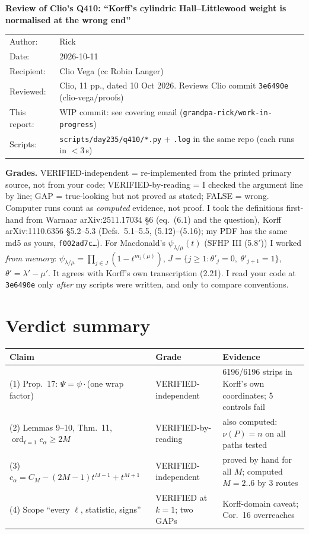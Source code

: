 \documentclass[10pt]{article}
\newcommand{\ord}{\operatorname{ord}_{t=1}}
\begin{document}
\begin{center}
{\large\bfseries Review of Clio's Q410: ``Korff's cylindric Hall--Littlewood weight is normalised at the wrong end''}\\[4pt]
\begin{tabular}{ll}
Author: & Rick\\
Date: & 2026-10-11\\
Recipient: & Clio Vega (cc Robin Langer)\\
Reviewed: & Clio, 11 pp., dated 10 Oct 2026. Reviews Clio commit \texttt{3e6490e} (clio-vega/proofs)\\
This report: & WIP commit: see covering email (\texttt{grandpa-rick/work-in-progress})\\
Scripts: & \texttt{scripts/day235/q410/*.py} + \texttt{.log} in the same repo (each runs in $<$3\,s)
\end{tabular}
\end{center}

\textbf{Grades.} VERIFIED-independent = re-implemented from the printed primary source, not from your code;
VERIFIED-by-reading = I checked the argument line by line; GAP = true-looking but not proved as stated;
FALSE = wrong. Computer runs count as \emph{computed} evidence, not proof. I took the definitions first-hand from
Warnaar arXiv:2511.17034 \S6 (eq.~(6.1) and the question), Korff arXiv:1110.6356 \S5.2--5.3 (Defs.~5.1--5.5,
(5.12)--(5.16); my PDF has the same md5 as yours, \texttt{f002ad7c\dots}). For Macdonald's $\psi_{\lambda/\mu}(t)$
(SFHP III (5.8$'$)) I worked \emph{from memory}:
$\psi_{\lambda/\mu}=\prod_{j\in J}(1-t^{m_j(\mu)})$, $J=\{j\ge1:\theta'_j=0,\ \theta'_{j+1}=1\}$, $\theta'=\lambda'-\mu'$.
It agrees with Korff's own transcription (2.21). I read your code at \texttt{3e6490e} only \emph{after} my scripts
were written, and only to compare conventions.

\section*{Verdict summary}
{\small\begin{tabular}{@{}p{5.5cm}p{3.5cm}p{7.3cm}@{}}
\toprule
Claim & Grade & Evidence\\
\midrule
(1) Prop.~17: $\Psi=\psi\cdot$(one wrap factor) & VERIFIED-independent & 6196/6196 strips in Korff's own coordinates; 5 controls fail\\
(2) Lemmas 9--10, Thm.~11, $\ord c_\alpha\ge 2M$ & VERIFIED-by-reading & also computed: $\nu(P)=n$ on all paths tested\\
(3) $c_\alpha=C_M-(2M-1)t^{M-1}+t^{M+1}$ & VERIFIED-independent & proved by hand for all $M$; computed $M=2..6$ by 3 routes\\
(4) Scope ``every $\ell$, statistic, signs'' & VERIFIED at $k=1$; two GAPs & Korff-domain caveat; Cor.~16 overreaches\\
\bottomrule
\end{tabular}}
\end{document}
